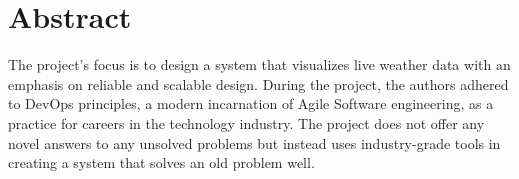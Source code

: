 \section{Abstract}
The project's focus is to design a system that visualizes live weather data with an emphasis on reliable and scalable design. 
During the project, the authors adhered to DevOps principles, a modern incarnation of Agile Software engineering, as a practice for careers in the technology industry.
The project does not offer any novel answers to any unsolved problems but instead uses industry-grade tools in creating a system that solves an old problem well.